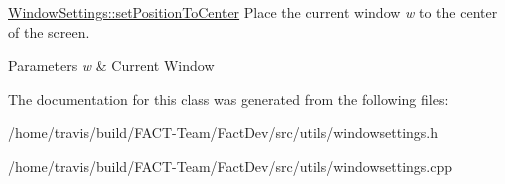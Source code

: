 \hyperlink{classWindowSettings_a30daec5f15eb722511dfb28333fdcef1}{Window\-Settings\-::set\-Position\-To\-Center} Place the current window {\itshape w} to the center of the screen. 


\begin{DoxyParams}{Parameters}
{\em w} & Current Window \\
\hline
\end{DoxyParams}


The documentation for this class was generated from the following files\-:\begin{DoxyCompactItemize}
\item 
/home/travis/build/\-F\-A\-C\-T-\/\-Team/\-Fact\-Dev/src/utils/windowsettings.\-h\item 
/home/travis/build/\-F\-A\-C\-T-\/\-Team/\-Fact\-Dev/src/utils/windowsettings.\-cpp\end{DoxyCompactItemize}
